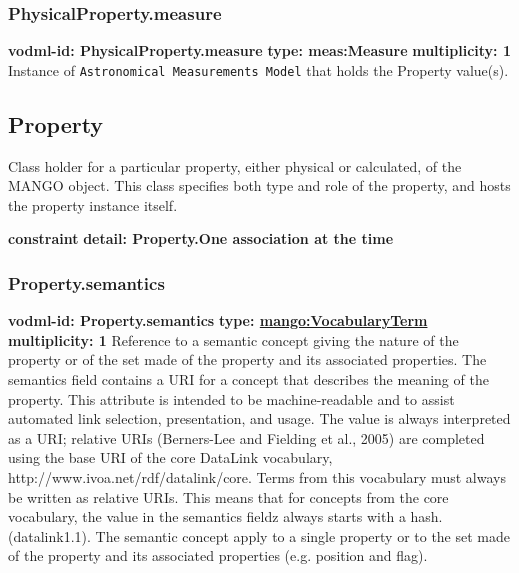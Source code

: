    \subsubsection{PhysicalProperty.measure}
      \textbf{vodml-id: PhysicalProperty.measure} \newline
      \textbf{type: meas:Measure} \newline
      \textbf{multiplicity: 1} \newline
      Instance of \texttt{Astronomical Measurements Model} that holds the Property value(s).

  \subsection{Property}
  \label{sect:Property}
    Class holder for a particular property, either physical or calculated, of the MANGO object. This class specifies both type and role of the property, and hosts the property instance itself.

    \noindent \textbf{constraint} \newline
    \indent    \textbf{detail: Property.One association at the time
 }\newline


    \subsubsection{Property.semantics}
      \textbf{vodml-id: Property.semantics} \newline
      \textbf{type: \hyperref[sect:VocabularyTerm]{mango:VocabularyTerm}} \newline
      \textbf{multiplicity: 1} \newline
      Reference to a semantic concept giving the nature of the property or of the set made of the property and its associated properties. The semantics field contains a URI for a concept that describes the meaning of the property. This attribute is intended to be machine-readable and to assist automated link selection, presentation, and usage. The value is always interpreted as a URI; relative URIs (Berners-Lee and Fielding et al., 2005) are completed using the base URI of the core DataLink vocabulary, http://www.ivoa.net/rdf/datalink/core. Terms from this vocabulary must always be written as relative URIs. This means that for concepts from the core vocabulary, the value in the semantics fieldz always starts with a hash. (datalink1.1). The semantic concept apply to a single property or to the set made of the property and its associated properties (e.g. position and flag).

